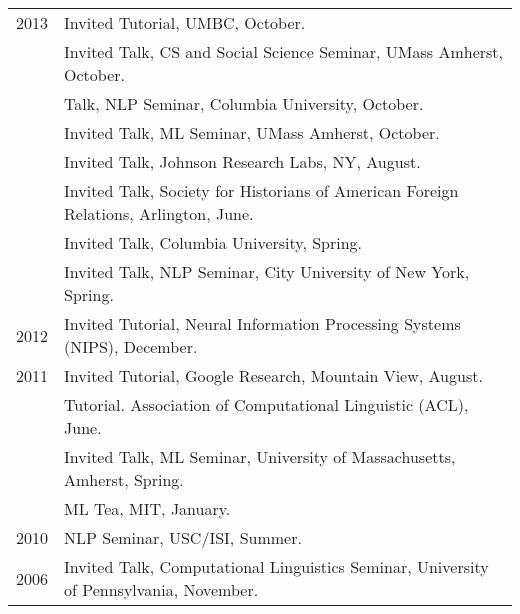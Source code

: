 \documentclass[10pt]{article}
\begin{document}
\hspace{-1cm} \begin{tabular}{lp{11.5cm}}
	2013
	     & \ind   Invited Tutorial, UMBC, October.                                                      \\

	     & \ind   Invited Talk, CS and Social Science Seminar, UMass Amherst, October.                  \\

	     & \ind   Talk, NLP Seminar, Columbia University, October.                                      \\
	     & \ind   Invited Talk, ML Seminar, UMass Amherst, October.                                     \\

	     & \ind  Invited Talk, Johnson Research Labs, NY, August.                                       \\

	     & \ind Invited Talk, Society for Historians of American Foreign Relations, Arlington, June.    \\

	     & \ind  Invited Talk, Columbia University, Spring.                                             \\

	     & \ind    Invited Talk, NLP Seminar, City University of New York, Spring.                      \\
	2012 & \ind   Invited Tutorial, Neural Information Processing Systems (NIPS), December.             \\
	2011 & \ind  Invited Tutorial, Google Research, Mountain View, August.                              \\
	     & \ind Tutorial. Association of Computational Linguistic (ACL), June.                          \\
	     & \ind  Invited Talk, ML Seminar, University of Massachusetts, Amherst, Spring.                \\
	     & \ind   ML Tea, MIT, January.                                                                 \\
	2010 & \ind  NLP Seminar, USC/ISI, Summer.                                                          \\
	2006 & \ind  Invited Talk, Computational Linguistics Seminar, University of Pennsylvania, November. \\
\end{tabular}




\bigskip







\end{document}
